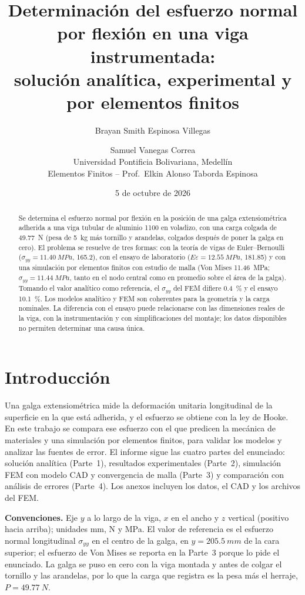 \documentclass[11pt,a4paper]{article}
\title{Determinaci\'on del esfuerzo normal por flexi\'on en una viga instrumentada:\\ soluci\'on anal\'itica, experimental y por elementos finitos}
\author{Brayan Smith Espinosa Villegas \and Samuel Vanegas Correa\\[2pt]
Universidad Pontificia Bolivariana, Medell\'in\\ Elementos Finitos -- Prof.\ Elkin Alonso Taborda Espinosa}
\date{5 de octubre de 2026}
\begin{document}
\maketitle

\begin{abstract}
Se determina el esfuerzo normal por flexi\'on en la posici\'on de una galga extensiom\'etrica adherida a una viga tubular de aluminio 1100 en voladizo, con una carga colgada de \SI{49,77}{N} (pesa de \SI{5}{kg} m\'as tornillo y arandelas, colgados despu\'es de poner la galga en cero). El problema se resuelve de tres formas: con la teor\'ia de vigas de Euler--Bernoulli ($\sigma_{yy}=\SI{11,40}{MPa}$, \SI{165,2}{\microstrain}), con el ensayo de laboratorio ($E\varepsilon=\SI{12,55}{MPa}$, \SI{181,85}{\microstrain}) y con una simulaci\'on por elementos finitos con estudio de malla (Von Mises \SI{11,46}{MPa}; $\sigma_{yy}=\SI{11,44}{MPa}$, tanto en el nodo central como en promedio sobre el \'area de la galga). Tomando el valor anal\'itico como referencia, el $\sigma_{yy}$ del FEM difiere \SI{+0,4}{\percent} y el ensayo \SI{+10,1}{\percent}. Los modelos anal\'itico y FEM son coherentes para la geometr\'ia y la carga nominales. La diferencia con el ensayo puede relacionarse con las dimensiones reales de la viga, con la instrumentaci\'on y con simplificaciones del montaje; los datos disponibles no permiten determinar una causa \'unica.
\end{abstract}

\tableofcontents
\newpage

\section{Introducci\'on}
Una galga extensiom\'etrica mide la deformaci\'on unitaria longitudinal de la superficie en la que est\'a adherida, y el esfuerzo se obtiene con la ley de Hooke. En este trabajo se compara ese esfuerzo con el que predicen la mec\'anica de materiales y una simulaci\'on por elementos finitos, para validar los modelos y analizar las fuentes de error. El informe sigue las cuatro partes del enunciado: soluci\'on anal\'itica (Parte~1), resultados experimentales (Parte~2), simulaci\'on FEM con modelo CAD y convergencia de malla (Parte~3) y comparaci\'on con an\'alisis de errores (Parte~4). Los anexos incluyen los datos, el CAD y los archivos del FEM.

\textbf{Convenciones.} Eje $y$ a lo largo de la viga, $x$ en el ancho y $z$ vertical (positivo hacia arriba); unidades mm, N y MPa. El valor de referencia es el esfuerzo normal longitudinal $\sigma_{yy}$ en el centro de la galga, en $y=\SI{205,5}{mm}$ de la cara superior; el esfuerzo de Von Mises se reporta en la Parte~3 porque lo pide el enunciado. La galga se puso en cero con la viga montada y antes de colgar el tornillo y las arandelas, por lo que la carga que registra es la pesa m\'as el herraje, $P=\SI{49,77}{N}$.
\end{document}
